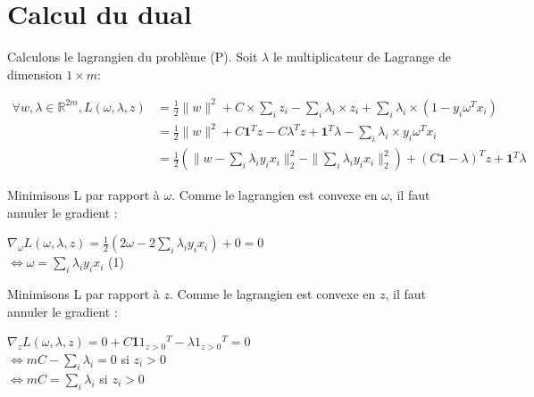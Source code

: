 \documentclass{article}
\begin{document}
\section{Calcul du dual}

Calculons le lagrangien du problème (P). Soit $\lambda$ le multiplicateur de Lagrange de dimension $1 \times m$:

              \begin{center}
              \begin{equation}
              \begin{split}
              \forall w, \lambda \in \mathbb{R}^{2m}, L(\omega, \lambda, z) 
              &= \frac{1}{2} \|w\|^2 + C \times \sum_i z_i - \sum_i \lambda_i \times z_i
              + \sum_i \lambda_i \times (1 - y_i \omega^{T} x_i)\\
              &= \frac{1}{2} \|w\|^2 + C\textbf{1}^{T}z - C\lambda^{T}z + \textbf{1}^{T}\lambda - \sum_i \lambda_i \times y_i \omega^{T} x_i\\
              &= \frac{1}{2} (\|w - \sum_i \lambda_iy_ix_i\|^2_2 - \|\sum_i \lambda_iy_ix_i\|^2_2)
              + (C\textbf{1} - \lambda)^{T}z + \textbf{1}^{T}\lambda
              \end{split}
              \end{equation}
              \end{center}

Minimisons L par rapport à $\omega$. Comme le lagrangien est convexe en $\omega$, il faut annuler le gradient :\\

              \begin{center}
              $\nabla_{\omega} L(\omega, \lambda, z) = \frac{1}{2}(2\omega - 2\sum_i \lambda_iy_ix_i) + 0 = 0$\\
              $\Leftrightarrow \omega = \sum_i \lambda_iy_ix_i$ (1)\\
              \end{center}

Minimisons L par rapport à $z$. Comme le lagrangien est convexe en $z$, il faut annuler le gradient :\\

              \begin{center}
              $\nabla_{z} L(\omega, \lambda, z) = 0 + C$\textbf{1}\textbf{$1_{z>0}$}$^T - \lambda$\textbf{$1_{z>0}$}$^T = 0$\\
              $\Leftrightarrow mC - \sum_i \lambda_i = 0$ si $z_i > 0$\\
              $\Leftrightarrow mC = \sum_i \lambda_i$ si $z_i > 0$\\
              \end{center}
\end{document}
